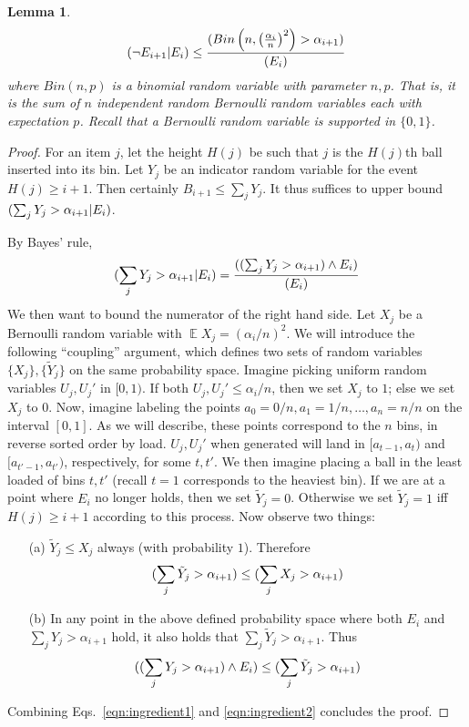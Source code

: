 \documentclass[11pt]{article}
\DeclareMathOperator*{\E}{\mathbb{E}}
\let\Pr\relax
\DeclareMathOperator*{\Pr}{\mathbb{P}}
\newtheorem{lemma}[theorem]{Lemma}
\begin{document}
\begin{lemma}\label{lem:binomial}
$$\Pr(\neg E_{i+1} | E_i) \leq \frac{\Pr(Bin\left(n, \left(\frac{\alpha_i}{n}\right)^2\right) > \alpha_{i+1})}{\Pr(E_i)}$$
where $Bin(n,p)$ is a binomial random variable with parameter $n,p$. That is, it is the sum of $n$ independent random Bernoulli random variables each with expectation $p$. Recall that a Bernoulli random variable is supported in $\{0,1\}$.
\end{lemma}
\begin{proof}
For an item $j$, let the height $H(j)$ be such that $j$ is the $H(j)$th ball inserted into its bin. Let $Y_j$ be an indicator random variable for the event $H(j) \ge i+1$. Then certainly $B_{i+1} \le \sum_j Y_j$. It thus suffices to upper bound $\Pr(\sum_j Y_j > \alpha_{i+1} | E_i)$.

By Bayes' rule,
$$
\Pr(\sum_j Y_j > \alpha_{i+1} | E_i) = \frac{\Pr((\sum_j Y_j > \alpha_{i+1}) \wedge E_i) }{\Pr(E_i)}
$$
We then want to bound the numerator of the right hand side. Let $X_j$ be a Bernoulli random variable with $\E X_j = (\alpha_i/n)^2$. We will introduce the following ``coupling'' argument, which defines two sets of random variables $\{X_j\}, \{\tilde{Y}_j\}$ on the same probability space. Imagine picking uniform random variables $U_j,U_j'$ in $[0,1)$. If both $U_j,U_j' \le \alpha_i/n$, then we set $X_j$ to $1$; else we set $X_j$ to $0$. Now, imagine labeling the points $a_0=0/n, a_1 = 1/n, \ldots, a_n = n/n$ on the interval $[0,1]$. As we will describe, these points correspond to the $n$ bins, in reverse sorted order by load. $U_j,U_j'$ when generated will land in $[a_{t-1}, a_t)$ and $[a_{t'-1},a_{t'})$, respectively, for some $t,t'$. We then imagine placing a ball in the least loaded of bins $t,t'$ (recall $t=1$ corresponds to the heaviest bin). If we are at a point where $E_i$ no longer holds, then we set $\tilde{Y}_j = 0$. Otherwise we set $\tilde{Y}_j = 1$ iff $H(j) \ge i+1$ according to this process. Now observe two things:
\begin{enumerate}
\item[(a)] $\tilde{Y}_j \le X_j$ always (with probability $1$). Therefore
\begin{equation}
\Pr(\sum_j \tilde{Y}_j > \alpha_{i+1}) \le \Pr(\sum_j X_j > \alpha_{i+1})\label{eqn:ingredient1}
\end{equation}
\item[(b)] In any point in the above defined probability space where both $E_i$ and $\sum_j Y_j > \alpha_{i+1}$ hold, it also holds that $\sum_j \tilde{Y}_j > \alpha_{i+1}$. Thus
\begin{equation}
\Pr((\sum_j Y_j > \alpha_{i+1})\wedge E_i) \le \Pr(\sum_j \tilde{Y}_j > \alpha_{i+1})\label{eqn:ingredient2}
\end{equation}
\end{enumerate}
Combining Eqs.\ \eqref{eqn:ingredient1} and \eqref{eqn:ingredient2} concludes the proof.
\end{proof}
\end{document}
